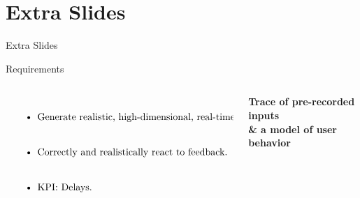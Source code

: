 \documentclass[aspectratio=1610]{beamer}
\begin{document}

\startpage
\section{Extra Slides}
\begin{frame}{}
    \begin{center}
        \Large Extra Slides
    \end{center}
\end{frame}

\normalpage
\begin{frame}{Requirements}
    \begin{columns}[onlytextwidth]
        \begin{column}{.5\linewidth}
            $\left.
                \begin{tabular}{p{.8\linewidth}}
                    \begin{itemize}
                        \itemsep2em
                        \item Generate realistic, high-dimensional, real-time inputs.
                        \item Correctly and realistically react to feedback.
                        \item KPI: Delays.
                    \end{itemize}
                \end{tabular}%
                \right\}$
        \end{column}%
        \begin{column}{.5\linewidth}
            \centering%
            \Large\bfseries%
            Trace of pre-recorded inputs\\
            \& a model of user behavior\\
        \end{column}
    \end{columns}
\end{frame}
\end{document}
